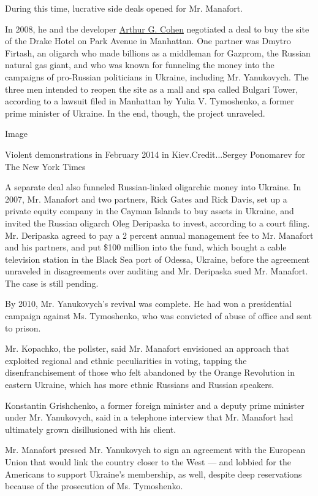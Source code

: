 During this time, lucrative side deals opened for Mr. Manafort.

In 2008, he and the developer
\href{https://www.nytimes.com/2014/08/16/nyregion/arthur-g-cohen-real-estate-developer-is-dead-at-84.html}{Arthur
G. Cohen} negotiated a deal to buy the site of the Drake Hotel on Park
Avenue in Manhattan. One partner was Dmytro Firtash, an oligarch who
made billions as a middleman for Gazprom, the Russian natural gas giant,
and who was known for funneling the money into the campaigns of
pro-Russian politicians in Ukraine, including Mr. Yanukovych. The three
men intended to reopen the site as a mall and spa called Bulgari Tower,
according to a lawsuit filed in Manhattan by Yulia V. Tymoshenko, a
former prime minister of Ukraine. In the end, though, the project
unraveled.

Image

Violent demonstrations in February 2014 in Kiev.Credit...Sergey
Ponomarev for The New York Times

A separate deal also funneled Russian-linked oligarchic money into
Ukraine. In 2007, Mr. Manafort and two partners, Rick Gates and Rick
Davis, set up a private equity company in the Cayman Islands to buy
assets in Ukraine, and invited the Russian oligarch Oleg Deripaska to
invest, according to a court filing. Mr. Deripaska agreed to pay a 2
percent annual management fee to Mr. Manafort and his partners, and put
\$100 million into the fund, which bought a cable television station in
the Black Sea port of Odessa, Ukraine, before the agreement unraveled in
disagreements over auditing and Mr. Deripaska sued Mr. Manafort. The
case is still pending.

By 2010, Mr. Yanukovych's revival was complete. He had won a
presidential campaign against Ms. Tymoshenko, who was convicted of abuse
of office and sent to prison.

Mr. Kopachko, the pollster, said Mr. Manafort envisioned an approach
that exploited regional and ethnic peculiarities in voting, tapping the
disenfranchisement of those who felt abandoned by the Orange Revolution
in eastern Ukraine, which has more ethnic Russians and Russian speakers.

Konstantin Grishchenko, a former foreign minister and a deputy prime
minister under Mr. Yanukovych, said in a telephone interview that Mr.
Manafort had ultimately grown disillusioned with his client.

Mr. Manafort pressed Mr. Yanukovych to sign an agreement with the
European Union that would link the country closer to the West --- and
lobbied for the Americans to support Ukraine's membership, as well,
despite deep reservations because of the prosecution of Ms. Tymoshenko.

